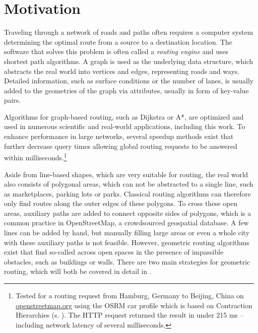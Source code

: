 
\section{Motivation}

	Traveling through a network of roads and paths often requires a computer system determining the optimal route from a source to a destination location.
	The software that solves this problem is often called a \emph{routing engine} and uses shortest path algorithms.
	A graph is used as the underlying data structure, which abstracts the real world into vertices and edges, representing roads and ways.
	Detailed information, such as surface conditions or the number of lanes, is usually added to the geometries of the graph via attributes, usually in form of key-value pairs.
	
	Algorithms for graph-based routing, such as Dijkstra or A*, are optimized and used in numerous scientific and real-world applications, including this work.
	To enhance performance in large networks, several speedup methods exist that further decrease query times allowing global routing requests to be answered within milliseconds.\footnote{Tested for a routing request from Hamburg, Germany to Beijing, China on \href{https://www.openstreetmap.org/directions?engine=fossgis\_osrm\_car&route=53.55\%2C10.00\%3B39.91\%2C116.39}{openstreetmap.org} using the OSRM car profile which is based on Contraction Hierarchies (s. ). The HTTP request returned the result in under 215 ms -- including network latency of several milliseconds.}
	
	Aside from line-based shapes, which are very suitable for routing, the real world also consists of polygonal areas, which can not be abstracted to a single line, such as marketplaces, parking lots or parks.
	Classical routing algorithms can therefore only find routes along the outer edges of these polygons.
	To cross these open areas, auxiliary paths are added to connect opposite sides of polygons, which is a common practice in OpenStreetMap, a crowdsourced geospatial database.
	A few lines can be added by hand, but manually filling large areas or even a whole city with these auxiliary paths is not feasible.
	However, geometric routing algorithms exist that find so-called  across open spaces in the presence of impassible obstacles, such as buildings or walls.
	There are two main strategies for geometric routing, which will both be covered in detail in .
	
